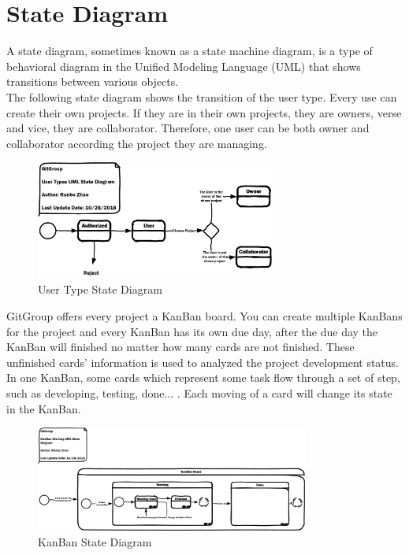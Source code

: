 \documentclass[12pt,a4paper]{report}
\begin{document}
\section{State Diagram}
A state diagram, sometimes known as a state machine diagram, is a type of behavioral diagram in the Unified Modeling Language (UML) that shows transitions between various objects. \\ 
The following state diagram shows the transition of the user type. Every use can create their own projects. If they are in their own projects, they are owners, verse and vice, they are collaborator. Therefore, one user can be both owner and collaborator according the project they are managing.\\
\begin{figure}[H]
	\centering
	\includegraphics[width=0.7\textwidth]{./pics/UserTypeStateDiagram.png}
	\caption{User Type State Diagram }
\end{figure}
GitGroup offers every project a KanBan board. You can create multiple KanBans for the project and every KanBan has its own due day, after the due day the KanBan will finished no matter how many cards are not finished. These unfinished cards' information is used to analyzed the project development status.\\
In one KanBan, some cards which represent some task flow through a set of step, such as developing, testing, done... . Each moving of a card will change its state in the KanBan.
\begin{figure}[H]
	\centering
	\includegraphics[width=0.8\textwidth]{./pics/KanBanStateDiagram.png}
	\caption{KanBan State Diagram }
\end{figure}
\end{document}
